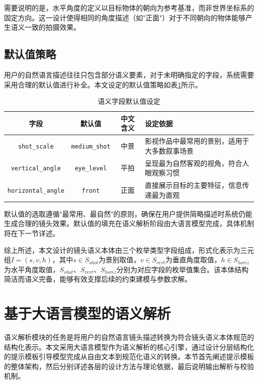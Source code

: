 需要说明的是，水平角度的定义以目标物体的朝向为参考基准，而非世界坐标系的固定方向。这一设计使得相同的角度描述（如"正面"）对于不同朝向的物体能够产生语义一致的拍摄效果。

\subsection{默认值策略}

用户的自然语言描述往往只包含部分语义要素，对于未明确指定的字段，系统需要采用合理的默认值进行补全。本文设定的默认值策略如表\ref{tab:default_values}所示。

\begin{table}[htbp]
\centering
\caption{语义字段默认值设定}
\label{tab:default_values}
\begin{tabular}{cccp{6cm}}
\toprule
字段 & 默认值 & 中文含义 & 设定依据 \\
\midrule
\texttt{shot\_scale} & \texttt{medium\_shot} & 中景 & 影视作品中最常用的景别，适用于大多数叙事场景 \\
\texttt{vertical\_angle} & \texttt{eye\_level} & 平拍 & 呈现最为自然客观的视角，符合人眼观察习惯 \\
\texttt{horizontal\_angle} & \texttt{front} & 正面 & 直接展示目标的主要特征，信息传递最为直观 \\
\bottomrule
\end{tabular}
\end{table}

默认值的选取遵循"最常用、最自然"的原则，确保在用户提供简略描述时系统仍能生成合理的镜头效果。默认值的填充在语义解析阶段由大语言模型完成，具体机制将在下一节详述。

综上所述，本文设计的镜头语义本体由三个枚举类型字段组成，形式化表示为三元组$I = (s, v, h)$，其中$s \in S_{shot}$为景别取值，$v \in S_{vert}$为垂直角度取值，$h \in S_{horiz}$为水平角度取值，$S_{shot}$、$S_{vert}$、$S_{horiz}$分别为对应字段的枚举值集合。该本体结构简洁而语义完备，能够有效支撑后续的约束建模与参数求解。

\section{基于大语言模型的语义解析}

语义解析模块的任务是将用户的自然语言镜头描述转换为符合镜头语义本体规范的结构化表示。本文采用大语言模型作为语义解析的核心引擎，通过设计分层结构化的提示模板引导模型完成从自由文本到规范化语义的转换。本节首先阐述提示模板的整体架构，然后分别详述各层的设计方法与理论依据，最后说明输出解析与校验机制。

